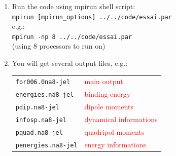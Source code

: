 \documentclass[10pt]{beamer}
\begin{document}
\begin{frame}
\frametitle{ }
\begin{enumerate}  
\item  Run the code using mpirun shell script:\\
\vspace*{0.2cm}
{\tt mpirun [mpirun\_options] ../../code/essai.par}\\
\vspace*{0.2cm}
e.g.:\\
\vspace*{0.2cm}
{\tt mpirun -np 8 ../../code/essai.par}\\
\vspace*{0.2cm}
(using 8 processors to run on)
\vspace*{0.4cm}
\item You will get several output files, e.g.:\\
\vspace*{0.2cm}
\begin{tabular}{ll}
\vspace*{0.1cm}
{\tt for006.0na8-jel} & {\small{\textcolor{red}{main output}}}\\
\vspace*{0.1cm}
{\tt energies.na8-jel} &{\small{\textcolor{red}{binding energy}}}\\
\vspace*{0.1cm}
{\tt pdip.na8-jel}& {\small{\textcolor{red}{dipole moments}}}\\
\vspace*{0.1cm}
{\tt infosp.na8-jel} & {\small{\textcolor{red}{dynamical informations}}}\\
\vspace*{0.1cm}
{\tt pquad.na8-jel} & {\small{\textcolor{red}{quadripol moments}}}\\
\vspace*{0.1cm}
{\tt penergies.na8-jel} & {\small{\textcolor{red}{energy informations}}}\\
\end{tabular}
\end{enumerate} 
 

   
\end{frame}

\end{document}
